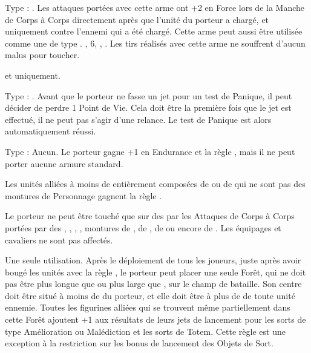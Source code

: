 Type : \hw{}. Les attaques portées avec cette arme ont +2 en Force lors de la Manche de Corps à Corps directement après que l'unité du porteur a chargé, et uniquement contre l'ennemi qui a été chargé. Cette arme peut aussi être utilisée comme une \textbf{\artilleryweapon} de type \textbf{\boltthrower}.\newline
{}, \Strength{} 6, , . Les tirs réalisés avec cette arme ne souffrent d'aucun malus pour toucher.

\soothsayers{} et \gnarledsoothsayers{} uniquement.

Type : \hw{}. Avant que le porteur ne fasse un jet pour un test de Panique, il peut décider de perdre 1 Point de Vie. Cela doit être la première fois que le jet est effectué, il ne peut pas s'agir d'une relance. Le test de Panique est alors automatiquement réussi.

\endpricelist

\armymagicalarmour

\startpricelist

Type : Aucun. Le porteur gagne +1 en Endurance et la règle , mais il ne peut porter aucune armure standard.

\endpricelist

\armytalismans

\startpricelist

Les unités alliées à moins de  entièrement composées de \razortusks{} ou de \chariots{} qui ne sont pas des montures de Personnage gagnent la règle \vanguard{}.

Le porteur ne peut être touché que sur des  par les Attaques de Corps à Corps portées par des \swarms{}, \warbeasts{}, \monstrousbeasts{}, \monsters{}, montures de \cavalry{}, de \monstrouscavalry{}, de \riddenmonsters{} ou encore de \chariots{}. Les équipages et cavaliers ne sont pas affectés.

\endpricelist

\armyenchanteditems

\startpricelist

Une seule utilisation. Après le déploiement de tous les joueurs, juste après avoir bougé les unités avec la règle \vanguard{}, le porteur peut placer une seule Forêt, qui ne doit pas être plus longue que  ou plus large que , sur le champ de bataille. Son centre doit être situé à moins de  du porteur, et elle doit être à plus de  de toute unité ennemie. Toutes les figurines alliées qui se trouvent même partiellement dans cette Forêt ajoutent +1 aux résultats de leurs jets de lancement pour les sorts de type Amélioration ou Malédiction et les sorts de Totem. Cette règle est une exception à la restriction sur les bonus de lancement des Objets de Sort.


